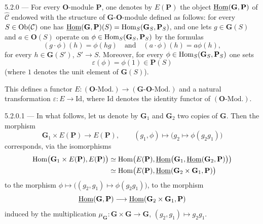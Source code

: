 \begin{definition}{5.2.0}\label{I.5.2.0}
--- {\renewcommand{\thefootnote}{(48)}}%
For every \(\mathbf{O}\)-module \(\mathbf{P}\), one denotes by \(E(\mathbf{P})\)
the object \(\underline{\operatorname{Hom}}(\mathbf{G}, \mathbf{P})\) of \(\widehat{\mathcal{C}}\)
endowed with the structure of \(\mathbf{G}\)-\(\mathbf{O}\)-module defined as
follows: for every \(S \in \operatorname{Ob}(\mathcal{C})\) one has
\(\underline{\operatorname{Hom}}(\mathbf{G}, \mathbf{P})(S)
= \operatorname{Hom}_{S}(\mathbf{G}_{S}, \mathbf{P}_{S})\), and one lets
\(g \in \mathbf{G}(S)\) and \(a \in \mathbf{O}(S)\) operate on
\(\phi \in \operatorname{Hom}_{S}(\mathbf{G}_{S}, \mathbf{P}_{S})\) by the formulas
\[
(g \cdot \phi)(h) = \phi(hg)
\quad\text{and}\quad
(a \cdot \phi)(h) = a\phi(h),
\]
for every \(h \in \mathbf{G}(S')\), \(S' \to S\). Moreover, for every
\(\phi \in \operatorname{Hom}_{S}(\mathbf{G}_{S}, \mathbf{P}_{S})\) one sets
\[
\varepsilon(\phi) = \phi(1) \in \mathbf{P}(S)
\]
(where \(1\) denotes the unit element of \(\mathbf{G}(S)\)).

This defines a functor
\(E \colon (\mathbf{O}\text{-}\mathrm{Mod.}) \to
(\mathbf{G}\text{-}\mathbf{O}\text{-}\mathrm{Mod.})\)
and a natural transformation \(\varepsilon \colon E \to \mathrm{Id}\), where
\(\mathrm{Id}\) denotes the identity functor of
\((\mathbf{O}\text{-}\mathrm{Mod.})\).
\end{definition}

\begin{remark}{5.2.0.1}\label{I.5.2.0.1}
--- {\renewcommand{\thefootnote}{(48)}\footnotemark[\value{footnote}]}
In what follows, let us denote by \(\mathbf{G}_{1}\) and \(\mathbf{G}_{2}\)
two copies of \(\mathbf{G}\). Then the morphism
\[
\mathbf{G}_{1} \times E(\mathbf{P}) \longrightarrow E(\mathbf{P}),
\qquad
(g_{1}, \phi) \longmapsto \bigl(g_{2} \mapsto \phi(g_{2}g_{1})\bigr)
\]
corresponds, via the isomorphisms
\begin{align*}
\operatorname{Hom}\bigl(\mathbf{G}_{1} \times E(\mathbf{P}), E(\mathbf{P})\bigr)
&\simeq \operatorname{Hom}\bigl(E(\mathbf{P}),
\underline{\operatorname{Hom}}\bigl(\mathbf{G}_{1}, \underline{\operatorname{Hom}}(\mathbf{G}_{2}, \mathbf{P})\bigr)\bigr) \\
&\simeq \operatorname{Hom}\bigl(E(\mathbf{P}),
\underline{\operatorname{Hom}}(\mathbf{G}_{2} \times \mathbf{G}_{1}, \mathbf{P})\bigr)
\end{align*}
to the morphism
\(\phi \mapsto \bigl((g_{2}, g_{1}) \mapsto \phi(g_{2}g_{1})\bigr)\),
\ie to the morphism
\[
\underline{\operatorname{Hom}}(\mathbf{G}, \mathbf{P}) \longrightarrow
\underline{\operatorname{Hom}}(\mathbf{G}_{2} \times \mathbf{G}_{1}, \mathbf{P})
\]
induced by the multiplication
\(\mu_{\mathbf{G}} \colon \mathbf{G} \times \mathbf{G} \to \mathbf{G}\),
\((g_{2}, g_{1}) \mapsto g_{2}g_{1}\).
\end{remark}

